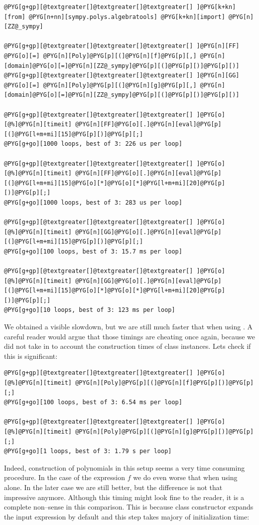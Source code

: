 \begin{Verbatim}[commandchars=@\[\]]
@PYG[g+gp][@textgreater[]@textgreater[]@textgreater[] ]@PYG[k+kn][from] @PYG[n+nn][sympy.polys.algebratools] @PYG[k+kn][import] @PYG[n][ZZ@_sympy]

@PYG[g+gp][@textgreater[]@textgreater[]@textgreater[] ]@PYG[n][FF] @PYG[o][=] @PYG[n][Poly]@PYG[p][(]@PYG[n][f]@PYG[p][,] @PYG[n][domain]@PYG[o][=]@PYG[n][ZZ@_sympy]@PYG[p][(]@PYG[p][)]@PYG[p][)]
@PYG[g+gp][@textgreater[]@textgreater[]@textgreater[] ]@PYG[n][GG] @PYG[o][=] @PYG[n][Poly]@PYG[p][(]@PYG[n][g]@PYG[p][,] @PYG[n][domain]@PYG[o][=]@PYG[n][ZZ@_sympy]@PYG[p][(]@PYG[p][)]@PYG[p][)]

@PYG[g+gp][@textgreater[]@textgreater[]@textgreater[] ]@PYG[o][@%]@PYG[n][timeit] @PYG[n][FF]@PYG[o][.]@PYG[n][eval]@PYG[p][(]@PYG[l+m+mi][15]@PYG[p][)]@PYG[p][;]
@PYG[g+go][1000 loops, best of 3: 226 us per loop]

@PYG[g+gp][@textgreater[]@textgreater[]@textgreater[] ]@PYG[o][@%]@PYG[n][timeit] @PYG[n][FF]@PYG[o][.]@PYG[n][eval]@PYG[p][(]@PYG[l+m+mi][15]@PYG[o][*]@PYG[o][*]@PYG[l+m+mi][20]@PYG[p][)]@PYG[p][;]
@PYG[g+go][1000 loops, best of 3: 283 us per loop]

@PYG[g+gp][@textgreater[]@textgreater[]@textgreater[] ]@PYG[o][@%]@PYG[n][timeit] @PYG[n][GG]@PYG[o][.]@PYG[n][eval]@PYG[p][(]@PYG[l+m+mi][15]@PYG[p][)]@PYG[p][;]
@PYG[g+go][100 loops, best of 3: 15.7 ms per loop]

@PYG[g+gp][@textgreater[]@textgreater[]@textgreater[] ]@PYG[o][@%]@PYG[n][timeit] @PYG[n][GG]@PYG[o][.]@PYG[n][eval]@PYG[p][(]@PYG[l+m+mi][15]@PYG[o][*]@PYG[o][*]@PYG[l+m+mi][20]@PYG[p][)]@PYG[p][;]
@PYG[g+go][10 loops, best of 3: 123 ms per loop]
\end{Verbatim}
\noindent
We obtained a visible slowdown, but we are still much faster that when using .
A careful reader would argue that those timings are cheating once again, because we did not
take in to account the construction times of  class instances. Lets check if
this is significant:

\begin{Verbatim}[commandchars=@\[\]]
@PYG[g+gp][@textgreater[]@textgreater[]@textgreater[] ]@PYG[o][@%]@PYG[n][timeit] @PYG[n][Poly]@PYG[p][(]@PYG[n][f]@PYG[p][)]@PYG[p][;]
@PYG[g+go][100 loops, best of 3: 6.54 ms per loop]

@PYG[g+gp][@textgreater[]@textgreater[]@textgreater[] ]@PYG[o][@%]@PYG[n][timeit] @PYG[n][Poly]@PYG[p][(]@PYG[n][g]@PYG[p][)]@PYG[p][;]
@PYG[g+go][1 loops, best of 3: 1.79 s per loop]
\end{Verbatim}
\noindent
Indeed, construction of polynomials in this setup seems a very time consuming procedure. In
the case of the expression $f$ we do even worse that when using  alone. In the
later case we are still better, but the difference is not that impressive anymore. Although
this timing might look fine to the reader, it is a complete non--sense in this comparison.
This is because  class constructor expands the input expression by default and
this step takes majory of initialization time:

